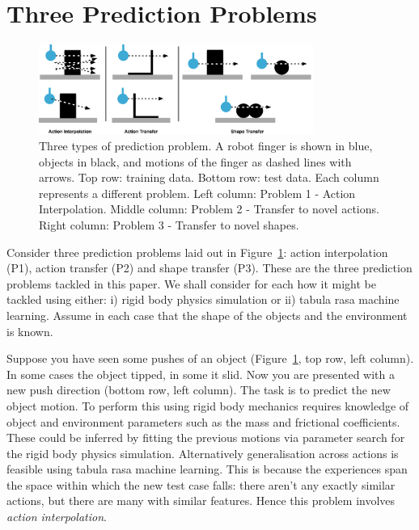 \section{Three Prediction Problems	}
\label{sec:schema}

\begin{figure}[t]
\centerline{\includegraphics[width=0.8\textwidth]{three-prediction-problems}}
\caption{Three types of prediction problem. A robot finger is shown in blue, objects in black, and motions of the finger as dashed lines with arrows. Top row: training data. Bottom row: test data. Each column represents a different problem. Left column: Problem 1 - Action Interpolation. Middle column: Problem 2 - Transfer to novel actions. Right column: Problem 3 - Transfer to novel shapes.}
\label{fig:three-prediction-problems}
\end{figure}

Consider three prediction problems laid out in Figure~\ref{fig:three-prediction-problems}: action interpolation (P1), action transfer (P2) and shape transfer (P3). These are the three prediction problems tackled in this paper.  We shall consider for each how it might be tackled using either: i) rigid body physics simulation or ii) tabula rasa machine learning. Assume in each case that the shape of the objects and the environment is known.

 Suppose you have seen some pushes of an object (Figure~\ref{fig:three-prediction-problems}, top row, left column). In some cases the object tipped, in some it slid. Now you are presented with a new push direction (bottom row, left column). The task is to predict the new object motion. To perform this using rigid body mechanics requires knowledge of object and environment parameters such as the mass and frictional coefficients. These could be inferred by fitting the previous motions via parameter search for the rigid body physics simulation. Alternatively generalisation across actions is feasible using tabula rasa machine learning. This is because the experiences span the space within which the new test case falls: there aren't any exactly similar actions, but there are many with similar features. Hence this problem involves {\em action interpolation}.

